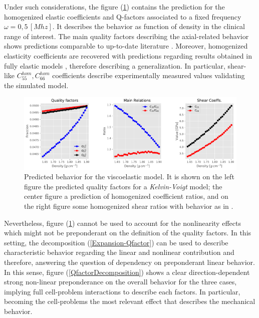 Under such considerations, the figure (\ref{BernardPredictionHomCoeffs}) contains the prediction for the homogenized elastic coefficients and Q-factors associated to a fixed frequency $\omega = 0,5 \, [Mhz]$. It describes the behavior as function of density in the clinical range of interest. The main quality factors describing the axial-related behavior shows predictions comparable to up-to-date literature \cite{Bernard2015}. Moreover, homogenized elasticity coefficients are recovered with predictions regarding results obtained in fully elastic models \cite{Parnell2008}, therefore describing a generalization.
In particular, shear-like $C_{55}^{hom}, C_{66}^{hom}$ coefficients describe experimentally measured values validating the simulated model.

\begin{figure}[!h]
	\centering
	\includegraphics[width=\textwidth]{images/Qfactors/CellProb_QfactorCircular5E-2_Relations.pdf}
	\caption{Predicted behavior for the viscoelastic model. It is shown on the left figure the predicted quality factors for a \textit{Kelvin-Voigt} model; the center figure a prediction of homogenized coefficient ratios, and on the right figure some homogenized shear ratios with behavior as in \cite{Bernard2015}.}
	\label{BernardPredictionHomCoeffs}
\end{figure} 

Nevertheless, figure (\ref{BernardPredictionHomCoeffs}) cannot be used to account for the nonlinearity effects which might not be preponderant on the definition of the quality factors. In this setting, the decomposition (\ref{Expansion-Qfactor}) can be used to describe characteristic behavior regarding the linear and nonlinear contribution and therefore, answering the question of dependency on preponderant linear behavior.  In this sense, figure (\ref{QfactorDecomposition}) shows a clear
direction-dependent strong non-linear preponderance on the overall behavior for the three cases, implying full cell-problem interactions to describe each factors. In particular, becoming the cell-problems the most relevant effect that describes the mechanical behavior.

